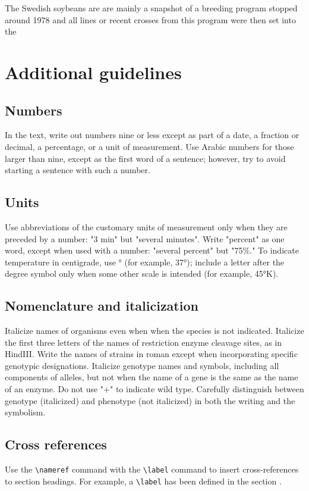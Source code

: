 \documentclass[9pt,twocolumn,twoside,lineno]{gsajnl}
\begin{document}
The Swedish soybeans are are mainly a snapshot of a breeding program stopped around 1978 and all lines or recent crosses from this program were then set into the  



\section{Additional guidelines}

\subsection{Numbers} In the text, write out numbers nine or less except as part of a date, a fraction or decimal, a percentage, or a unit of measurement. Use Arabic numbers for those larger than nine, except as the first word of a sentence; however, try to avoid starting a sentence with such a number.

\subsection{Units} Use abbreviations of the customary units of measurement only when they are preceded by a number: "3 min" but "several minutes". Write "percent" as one word, except when used with a number: "several percent" but "75\%." To indicate temperature in centigrade, use ° (for example, 37°); include a letter after the degree symbol only when some other scale is intended (for example, 45°K).

\subsection{Nomenclature and italicization} Italicize names of organisms even when  when the species is not indicated.  Italicize the first three letters of the names of restriction enzyme cleavage sites, as in HindIII. Write the names of strains in roman except when incorporating specific genotypic designations. Italicize genotype names and symbols, including all components of alleles, but not when the name of a gene is the same as the name of an enzyme. Do not use "+" to indicate wild type. Carefully distinguish between genotype (italicized) and phenotype (not italicized) in both the writing and the symbolism.

\subsection{Cross references}
Use the \verb|\nameref| command with the \verb|\label| command to insert cross-references to section headings. For example, a \verb|\label| has been defined in the section .
\end{document}
